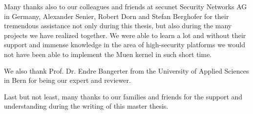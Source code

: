 \documentclass[a4paper,twoside]{report}
\begin{document}
Many thanks also to our colleagues and friends at secunet Security Networks AG
in Germany, Alexander Senier, Robert Dorn and Stefan Berghofer for their
tremendous assistance not only during this thesis, but also during the many
projects we have realized together. We were able to learn a lot and without
their support and immense knowledge in the area of high-security platforms we
would not have been able to implement the Muen kernel in such short time.

We also thank Prof. Dr. Endre Bangerter from the University of Applied Sciences
in Bern for being our expert and reviewer.

Last but not least, many thanks to our families and friends for the support and
understanding during the writing of this master thesis.

\tableofcontents
\listoffigures
\listoftables
\lstlistoflistings








\printindex{}



\end{document}
